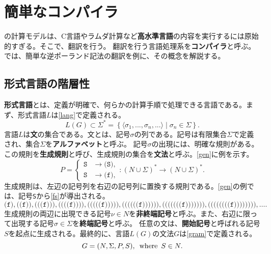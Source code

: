 \documentclass[10pt,a4paper]{book}
\begin{document}
\chapter{簡単なコンパイラ\label{chap:math}}

の計算モデルは、C言語やラムダ計算など\textbf{高水準言語}の内容を実行するには原始的すぎる。そこで、翻訳を行う。
翻訳を行う言語処理系を\textbf{コンパイラ}と呼ぶ。では、簡単な逆ポーランド記法の翻訳を例に、その概念を解説する。

\section{形式言語の階層性\label{sect:lang}}

\textbf{形式言語}とは、定義が明確で、何らかの計算手順で処理できる言語である。まず、形式言語$L$は\eqref{lang}で定義される。
%
\begin{equation}
\label{eq:lang}
L(G) \subset \Sigma^* = \left\{\langle\sigma_1,...,\sigma_n,...\rangle\mid\sigma_n\in\Sigma\right\}.
\end{equation}
%
言語$L$は\textbf{文}の集合である。文とは、記号$\sigma$の列である。記号は有限集合$\Sigma$で定義され、集合$\Sigma$を\textbf{アルファベット}と呼ぶ。
記号$\sigma$の出現には、明確な規則がある。この規則を\textbf{生成規則}と呼び、生成規則の集合を\textbf{文法}と呼ぶ。\eqref{gen}に例を示す。
%
\begin{equation}
\label{eq:gen}
P = \left\{
\begin{aligned}
\mathtt{S} &\to \texttt{(S)},\\
\mathtt{S} &\to \texttt{(f)},
\end{aligned}
\right.:(N\cup\Sigma)^*\to(N\cup\Sigma)^*.
\end{equation}
%
生成規則は、左辺の記号列を右辺の記号列に置換する規則である。\eqref{gen}の例では、記号\texttt{S}から\eqref{fs}が導出される。
%
\begin{equation}
\label{eq:fs}
\texttt{(f)},
\texttt{((f))},
\texttt{(((f)))},
\texttt{((((f))))},
\texttt{(((((f)))))},
\texttt{((((((f))))))},
\texttt{(((((((f)))))))},
\texttt{((((((((f))))))))},
\ldots.
\end{equation}
%
生成規則の両辺に出現できる記号$\nu\!\in\!N$を\textbf{非終端記号}と呼ぶ。また、右辺に限って出現する記号$\sigma\!\in\!\Sigma$を\textbf{終端記号}と呼ぶ。
任意の文は、\textbf{開始記号}と呼ばれる記号$S$を起点に生成される。最終的に、言語$L(G)$の文法$G$は\eqref{gram}で定義される。
%
\begin{equation}
\label{eq:gram}
G=(N,\Sigma,P,S),\enspace\mathrm{where}\enspace S\in N.
\end{equation}
\end{document}
